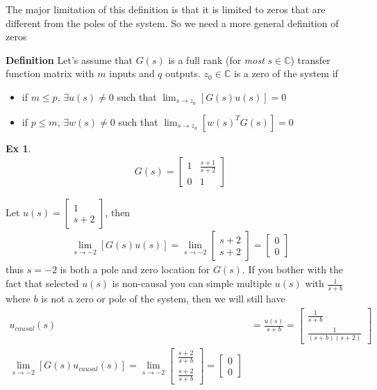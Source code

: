 \documentclass[twoside]{article}
\newtheorem{exmp}[theorem]{Ex}
\begin{document}
\vspace{12pt}

The major limitation of this definition is that it is limited to zeros that are different from the poles of the system. So we 
need a more general definition of zeros 

\vspace{12pt}

\textbf{Definition} Let's assume that $G(s)$ is a full rank (for \textit{most} $s \in \mathbb{C}$) transfer function matrix with $m$
inputs and $q$ outputs. $z_0 \in \mathbb{C}$ is a zero of the system if
\begin{itemize}
\item if $m \leq p$, $\exists u(s) \neq 0$ such that $\lim_{s \to z_0} [ G(s) u(s) ] = 0$
\item if $p \leq m$, $\exists w(s) \neq 0$ such that $\lim_{s \to z_0} [ w(s)^T G(s) ] = 0$
\end{itemize}
%
\begin{exmp}
	\begin{align*}
	G(s) = \left[ \begin{array}{ccc} 1 & \frac{s+1}{s+2}  \\  
	0 & 1  \end{array} \right]
	\end{align*}
\end{exmp}

Let $u(s) = \begin{bmatrix} 1 \\ s+2 \end{bmatrix}$, then
%
\begin{align*}
\lim_{s \to -2} [ G(s) u(s) ] = \lim_{s \to -2} \begin{bmatrix} s+2 \\ s+2 \end{bmatrix} = \begin{bmatrix} 0 \\ 0 \end{bmatrix}
\end{align*}
%
thus $s = -2$ is both a pole and zero location for $G(s)$. If you bother with the fact that selected $u(s)$ is non-causal you can simple multiple $u(s)$ with $\frac{1}{s+b}$ where $b$ is not a zero or pole of the system, then we will still have 
%
%
\begin{align*}
u_{causal}(s) &= \frac{u(s)}{s+b} = \begin{bmatrix} \frac{1}{s+b} \\ \frac{1}{(s+b)(s+2)} \end{bmatrix}
\\
\lim_{s \to -2} [ G(s) u_{causal}(s) ] = \lim_{s \to -2} \begin{bmatrix} \frac{s+2}{s+b} \\ \frac{s+2}{s+b} \end{bmatrix} = \begin{bmatrix} 0 \\ 0 \end{bmatrix}
\end{align*}
%
\end{document}
